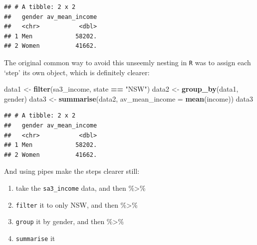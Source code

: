 \documentclass[]{book}
\newenvironment{Shaded}{\begin{snugshade}}{\end{snugshade}}
\newcommand{\CommentTok}[1]{\textcolor[rgb]{0.56,0.35,0.01}{\textit{#1}}}
\newcommand{\DataTypeTok}[1]{\textcolor[rgb]{0.13,0.29,0.53}{#1}}
\newcommand{\KeywordTok}[1]{\textcolor[rgb]{0.13,0.29,0.53}{\textbf{#1}}}
\newcommand{\NormalTok}[1]{#1}
\newcommand{\OperatorTok}[1]{\textcolor[rgb]{0.81,0.36,0.00}{\textbf{#1}}}
\newcommand{\StringTok}[1]{\textcolor[rgb]{0.31,0.60,0.02}{#1}}
\providecommand{\tightlist}{%
  \setlength{\itemsep}{0pt}\setlength{\parskip}{0pt}}
\begin{document}
\begin{verbatim}
## # A tibble: 2 x 2
##   gender av_mean_income
##   <chr>           <dbl>
## 1 Men            58202.
## 2 Women          41662.
\end{verbatim}

The original common way to avoid this unseemly nesting in \texttt{R} was to assign each `step' its own object, which is definitely clearer:

\begin{Shaded}
\begin{Highlighting}[]
\NormalTok{data1 <-}\StringTok{ }\KeywordTok{filter}\NormalTok{(sa3_income, state }\OperatorTok{==}\StringTok{ "NSW"}\NormalTok{)}
\NormalTok{data2 <-}\StringTok{ }\KeywordTok{group_by}\NormalTok{(data1, gender)}
\NormalTok{data3 <-}\StringTok{ }\KeywordTok{summarise}\NormalTok{(data2, }\DataTypeTok{av_mean_income =} \KeywordTok{mean}\NormalTok{(income))}
\NormalTok{data3}
\end{Highlighting}
\end{Shaded}

\begin{verbatim}
## # A tibble: 2 x 2
##   gender av_mean_income
##   <chr>           <dbl>
## 1 Men            58202.
## 2 Women          41662.
\end{verbatim}

And using pipes make the steps clearer still:

\begin{enumerate}
\def\labelenumi{\arabic{enumi}.}
\tightlist
\item
  take the \texttt{sa3\_income} data, and then \%\textgreater{}\%
\item
  \texttt{filter} it to only NSW, and then \%\textgreater{}\%
\item
  \texttt{group} it by gender, and then \%\textgreater{}\%
\item
  \texttt{summarise} it
\end{enumerate}

\begin{Shaded}
\end{Shaded}
\end{document}
